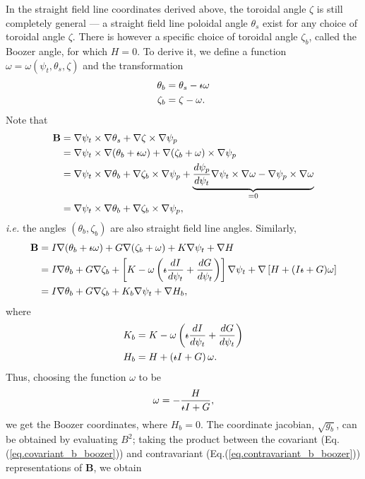 In the straight field line coordinates derived above, the toroidal angle $\zeta$ is still completely general --- a straight field line poloidal angle $\theta_s$ exist for any choice of toroidal angle $\zeta$. There is however a specific choice of toroidal angle $\zeta_b$, called the Boozer angle, for which $H=0$. To derive it, we define a function $\omega=\omega(\psi_t,\theta_s,\zeta)$ and the transformation
\begin{align}
	\theta_b &= \theta_s -\text{$\iota\!\!$-}\omega\\
	\zeta_b &= \zeta - \omega.
\end{align}
Note that
\begin{align}
	\mathbf{B} &= \nabla\psi_t\times\nabla\theta_s + \nabla\zeta\times\nabla\psi_p\\
	&= \nabla\psi_t\times\nabla(\theta_b+\text{$\iota\!\!$-}\omega) + \nabla(\zeta_b+\omega)\times\nabla\psi_p\\
	&= \nabla\psi_t\times\nabla\theta_b + \nabla\zeta_b\times\nabla\psi_p + \underbrace{\frac{d\psi_p}{d\psi_t}\nabla\psi_t\times\nabla\omega - \nabla\psi_p\times\nabla\omega}_{=0}\\
	&= \nabla\psi_t\times\nabla\theta_b + \nabla\zeta_b\times\nabla\psi_p, \label{eq.covariant_b_boozer}
\end{align}
\textit{i.e.} the angles $(\theta_b,\zeta_b)$ are also straight field line angles. Similarly, 
\begin{align}
	\mathbf{B} &= I\nabla(\theta_b+\text{$\iota\!\!$-}\omega) + G\nabla(\zeta_b+\omega) + K \nabla\psi_t + \nabla H\\
	&= I\nabla\theta_b + G\nabla\zeta_b + \left[K-\omega\left(\text{$\iota\!\!$-}\frac{dI}{d\psi_t}+\frac{dG}{d\psi_t}\right)\right]\nabla\psi_t + \nabla\left[H+(I\text{$\iota\!\!$-}+G)\omega\right]\\
	&= I\nabla\theta_b + G\nabla\zeta_b + K_b\nabla\psi_t + \nabla H_b, \label{eq.contravariant_b_boozer}
\end{align}
where 
\begin{align}
	K_b &= K-\omega\left(\text{$\iota\!\!$-}\frac{dI}{d\psi_t}+\frac{dG}{d\psi_t}\right)\\
	H_b &= H + \left(\text{$\iota\!\!$-} I + G\right) \omega.
\end{align}
Thus, choosing the function $\omega$ to be 
\begin{equation}
	\omega = -\frac{H}{\text{$\iota\!\!$-} I + G},
\end{equation}
we get the Boozer coordinates, where $H_b = 0$. The coordinate jacobian, $\sqrt{g_b}$, can be obtained by evaluating $B^2$; taking the product between the covariant (Eq.(\ref{eq.covariant_b_boozer})) and contravariant (Eq.(\ref{eq.contravariant_b_boozer})) representations of $\mathbf{B}$, we obtain
